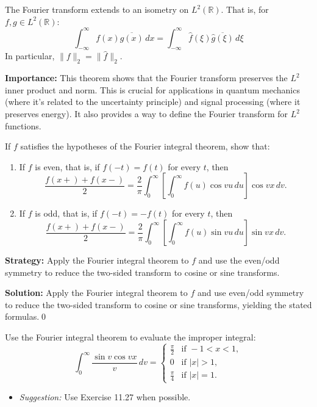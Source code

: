 \begin{theorem}
The Fourier transform extends to an isometry on $L^2(\mathbb{R})$. That is, for $f, g \in L^2(\mathbb{R})$:
\[\int_{-\infty}^{\infty} f(x) \overline{g(x)} \, dx = \int_{-\infty}^{\infty} \hat{f}(\xi) \overline{\hat{g}(\xi)} \, d\xi\]
In particular, $\|f\|_2 = \|\hat{f}\|_2$.
\end{theorem}

\noindent\textbf{Importance:} This theorem shows that the Fourier transform preserves the $L^2$ inner product and norm. This is crucial for applications in quantum mechanics (where it's related to the uncertainty principle) and signal processing (where it preserves energy). It also provides a way to define the Fourier transform for $L^2$ functions.





\begin{problembox}
\begin{problemstatement}
If $f$ satisfies the hypotheses of the Fourier integral theorem, show that:
\begin{enumerate}[label=(\alph*)]
\item If $f$ is even, that is, if $f(-t) = f(t)$ for every $t$, then
\[
\frac{f(x+) + f(x-)}{2} = \frac{2}{\pi} \int_0^\infty \left[ \int_0^\infty f(u) \cos vu \, du \right] \cos vx \, dv.
\]
\item If $f$ is odd, that is, if $f(-t) = -f(t)$ for every $t$, then
\[
\frac{f(x+) + f(x-)}{2} = \frac{2}{\pi} \int_0^\infty \left[ \int_0^\infty f(u) \sin vu \, du \right] \sin vx \, dv.
\]
\end{enumerate}
\end{problemstatement}
\end{problembox}

\noindent\textbf{Strategy:} Apply the Fourier integral theorem to $f$ and use the even/odd symmetry to reduce the two-sided transform to cosine or sine transforms.

\bigskip\noindent\textbf{Solution:}
Apply the Fourier integral theorem to $f$ and use even/odd symmetry to reduce the two-sided transform to cosine or sine transforms, yielding the stated formulas.\qed


\begin{problembox}
\begin{problemstatement}
Use the Fourier integral theorem to evaluate the improper integral:
\[
\int_0^\infty \frac{\sin v \cos vx}{v} \, dv = 
\begin{cases} 
\frac{\pi}{2} & \text{if } -1 < x < 1, \\
0 & \text{if } |x| > 1, \\
\frac{\pi}{4} & \text{if } |x| = 1.
\end{cases}
\]
\begin{itemize}
\item \textit{Suggestion:} Use Exercise 11.27 when possible.
\end{itemize}
\end{problemstatement}
\end{problembox}

